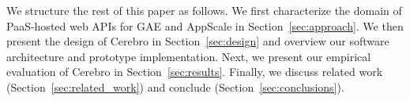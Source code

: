 
We structure the rest of this paper as follows.
We first characterize the domain of 
PaaS-hosted web APIs for GAE and AppScale 
in Section~\ref{sec:approach}.   
We then present the design of Cerebro in Section~\ref{sec:design}
and overview our software architecture and prototype implementation.
Next, we
present our empirical evaluation of Cerebro in 
Section~\ref{sec:results}.
Finally,  we discuss related work (Section~\ref{sec:related_work}) and 
conclude (Section~\ref{sec:conclusions}).